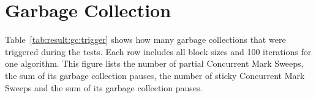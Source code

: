 %

\section{Garbage Collection}
\label{ch:gc}
Table~\ref{tab:result:gc:trigger} shows how many garbage collections that were triggered during the tests. Each row includes all block sizes and 100 iterations for one algorithm. This figure lists the number of partial Concurrent Mark Sweeps, the sum of its garbage collection pauses, the number of sticky Concurrent Mark Sweeps and the sum of its garbage collection pauses.

